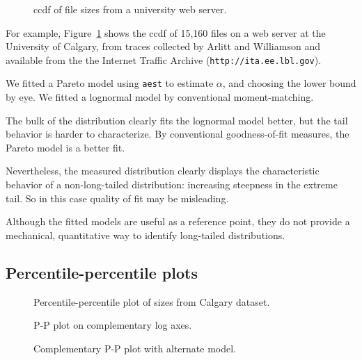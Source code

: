 \documentclass[twocolumn,11pt]{infocom}
\begin{document}
\begin{figure}[tb]
\centerline{}
\caption{ccdf of file sizes from a university web server.}
\label{fig.calgary}
\end{figure}

For example, Figure~\ref{fig.calgary} shows the ccdf of 15,160
files on a web server at the University of Calgary, from traces
collected by Arlitt and Williamson \cite{ArlittWilliamson96} and
available from the the Internet Traffic Archive
(\texttt{http://ita.ee.lbl.gov}).

We fitted a Pareto model using \texttt{aest} to estimate $\alpha$,
and choosing the lower bound by eye.  We fitted a lognormal model by
conventional moment-matching.

The bulk of the distribution clearly fits the lognormal model
better, but the tail behavior is harder to characterize.
By conventional goodness-of-fit measures, the Pareto
model is a better fit.

Nevertheless, the measured distribution clearly displays the
characteristic behavior of a non-long-tailed distribution: increasing
steepness in the extreme tail.  So in this case quality of
fit may be misleading.

Although the fitted models are useful
as a reference point, they do not provide a mechanical,
quantitative way to identify long-tailed distributions.


\subsection {Percentile-percentile plots}

\begin{figure}[tb]
\centerline{}
\caption{Percentile-percentile plot of sizes from Calgary dataset.}
\label{fig.pp}
\end{figure}

\begin{figure}[tb]
\centerline{}
\caption{P-P plot on complementary log axes.}
\label{fig.logpp}
\end{figure}

\begin{figure}[tb]
\centerline{}
\caption{Complementary P-P plot with alternate model.}
\label{fig.altpp}
\end{figure}
\end{document}
